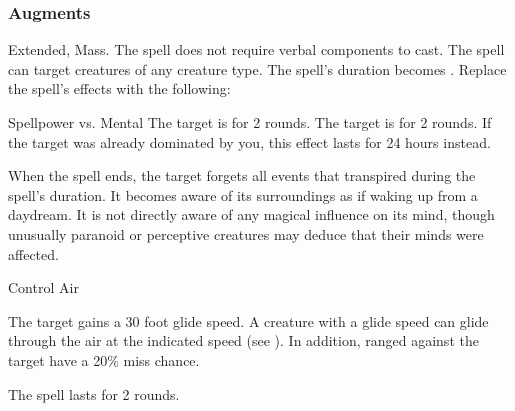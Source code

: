 \subsubsection{Augments}
 Extended, Mass.
The spell does not require verbal components to cast.
The spell can target creatures of any creature type.
The spell's duration becomes \durext.
Replace
the spell's effects with the following:
\begin{augmenteffects}
\begin{spellattack}{Spellpower vs. Mental}
\spellsuccess The target is \confused for 2 rounds.
\spellcritical
The target is \dominated for 2 rounds.
If the target was already dominated by you, this effect lasts for 24 hours instead.
\end{spellattack}
\end{augmenteffects}
When the spell ends, the target forgets all events that transpired during the spell's duration.
It becomes aware of its surroundings as if waking up from a daydream.
It is not directly aware of any magical influence on its mind, though unusually paranoid or perceptive creatures may deduce that their minds were affected.
\begin{spellsection}{Control Air}
\begin{spellheader}
\end{spellheader}
\begin{spellcontent}
\begin{spelltargetinginfo}
\end{spelltargetinginfo}
\begin{spelleffects}
\spelleffect
The target gains a 30 foot glide speed.
A creature with a glide speed can glide through the air at the indicated speed (see ).
In addition, ranged  against the target have a 20\% miss chance.
\spelldur \durshort
\end{spelleffects}
\end{spellcontent}
\begin{spellfooter}
\miscastexplode
\end{spellfooter}
\begin{spellcantrip}
The spell lasts for 2 rounds.
\end{spellcantrip}
\end{spellsection}
